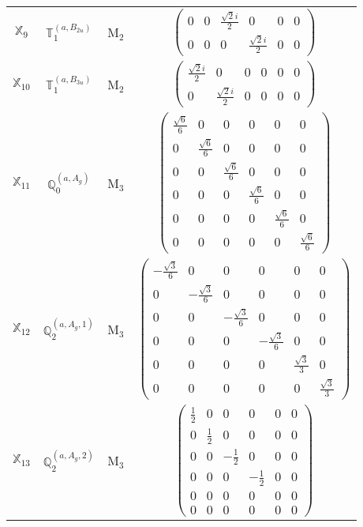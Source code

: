 \documentclass[fleqn,10pt,landscape]{article}
\begin{document}
\begin{itemize}
\begin{center}
\begin{longtable}{c|c|c|c}
$ \mathbb{X}_{9} $ & $\mathbb{T}_{1}^{(a,B_{2u})}$ & M$_{2}$ & $\begin{pmatrix} 0 & 0 & \frac{\sqrt{2} i}{2} & 0 & 0 & 0 \\ 0 & 0 & 0 & \frac{\sqrt{2} i}{2} & 0 & 0 \end{pmatrix}$ \\
$ \mathbb{X}_{10} $ & $\mathbb{T}_{1}^{(a,B_{3u})}$ & M$_{2}$ & $\begin{pmatrix} \frac{\sqrt{2} i}{2} & 0 & 0 & 0 & 0 & 0 \\ 0 & \frac{\sqrt{2} i}{2} & 0 & 0 & 0 & 0 \end{pmatrix}$ \\ \hline
$ \mathbb{X}_{11} $ & $\mathbb{Q}_{0}^{(a,A_{g})}$ & M$_{3}$ & $\begin{pmatrix} \frac{\sqrt{6}}{6} & 0 & 0 & 0 & 0 & 0 \\ 0 & \frac{\sqrt{6}}{6} & 0 & 0 & 0 & 0 \\ 0 & 0 & \frac{\sqrt{6}}{6} & 0 & 0 & 0 \\ 0 & 0 & 0 & \frac{\sqrt{6}}{6} & 0 & 0 \\ 0 & 0 & 0 & 0 & \frac{\sqrt{6}}{6} & 0 \\ 0 & 0 & 0 & 0 & 0 & \frac{\sqrt{6}}{6} \end{pmatrix}$ \\
$ \mathbb{X}_{12} $ & $\mathbb{Q}_{2}^{(a,A_{g},1)}$ & M$_{3}$ & $\begin{pmatrix} - \frac{\sqrt{3}}{6} & 0 & 0 & 0 & 0 & 0 \\ 0 & - \frac{\sqrt{3}}{6} & 0 & 0 & 0 & 0 \\ 0 & 0 & - \frac{\sqrt{3}}{6} & 0 & 0 & 0 \\ 0 & 0 & 0 & - \frac{\sqrt{3}}{6} & 0 & 0 \\ 0 & 0 & 0 & 0 & \frac{\sqrt{3}}{3} & 0 \\ 0 & 0 & 0 & 0 & 0 & \frac{\sqrt{3}}{3} \end{pmatrix}$ \\
$ \mathbb{X}_{13} $ & $\mathbb{Q}_{2}^{(a,A_{g},2)}$ & M$_{3}$ & $\begin{pmatrix} \frac{1}{2} & 0 & 0 & 0 & 0 & 0 \\ 0 & \frac{1}{2} & 0 & 0 & 0 & 0 \\ 0 & 0 & - \frac{1}{2} & 0 & 0 & 0 \\ 0 & 0 & 0 & - \frac{1}{2} & 0 & 0 \\ 0 & 0 & 0 & 0 & 0 & 0 \\ 0 & 0 & 0 & 0 & 0 & 0 \end{pmatrix}$ \\

\end{longtable}
\end{center}
\end{itemize}
\end{document}
